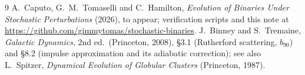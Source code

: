 \documentclass[11pt]{article}
\newcommand{\bnt}{b_{90}}
\begin{document}
\begin{thebibliography}{9}
 A.~Caputo, G.~M.~Tomaselli and C.~Hamilton, \emph{Evolution of Binaries Under
Stochastic Perturbations} (2026), to appear; verification scripts and this note at
\url{https://github.com/gimmytomas/stochastic-binaries}.
 J.~Binney and S.~Tremaine, \emph{Galactic Dynamics}, 2nd ed.\ (Princeton, 2008),
\S3.1 (Rutherford scattering, $\bnt$) and \S8.2 (impulse approximation and its adiabatic correction);
see also L.~Spitzer, \emph{Dynamical Evolution of Globular Clusters} (Princeton, 1987).
\end{thebibliography}
\end{document}

